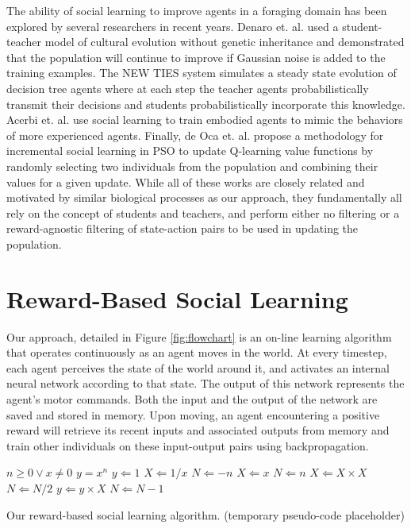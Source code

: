 \documentclass{acm_proc_article-sp}
\begin{document}
The ability of social learning to improve agents in a foraging domain has been explored by several researchers in recent years. Denaro et. al. \cite{denaro1996cultural} used a student-teacher model of cultural evolution without genetic inheritance and demonstrated that the population will continue to improve if Gaussian noise is added to the training examples. The NEW TIES system \cite{haasdijk2008social, vogt2010modeling} simulates a steady state evolution of decision tree agents where at each step the teacher agents probabilistically transmit their decisions and students probabilistically incorporate this knowledge. Acerbi et. al. \cite{acerbi2007social} use social learning to train embodied agents to mimic the behaviors of more experienced agents. Finally, de Oca et. al. \cite{de2011incremental} propose a methodology for incremental social learning in PSO to update Q-learning \cite{watkins1992q} value functions by randomly selecting two individuals from the population and combining their values for a given update. While all of these works are closely related and motivated by similar biological processes as our approach, they fundamentally all rely on the concept of students and teachers, and perform either no filtering or a reward-agnostic filtering of state-action pairs to be used in updating the population.


\section{Reward-Based Social Learning}
\label{sec:rbsl}

Our approach, detailed in Figure \ref{fig:flowchart} is an on-line learning algorithm that operates continuously as an agent moves in the world. At every timestep, each agent perceives the state of the world around it, and activates an internal neural network according to that state. The output of this network represents the agent's motor commands. Both the input and the output of the network are saved and stored in memory. Upon moving, an agent encountering a positive reward will retrieve its recent inputs and associated outputs from memory and train other individuals on these input-output pairs using backpropagation.

\begin{algorithm}
\begin{algorithmic}
\REQUIRE $n \geq 0 \vee x \neq 0$
\ENSURE $y = x^n$
\STATE $y \Leftarrow 1$
\STATE $X \Leftarrow 1 / x$
\STATE $N \Leftarrow -n$
\ELSE
\STATE $X \Leftarrow x$
\STATE $N \Leftarrow n$
\ENDIF
{}
\STATE $X \Leftarrow X \times X$
\STATE $N \Leftarrow N / 2$
\ELSE[$N$ is odd]
\STATE $y \Leftarrow y \times X$
\STATE $N \Leftarrow N - 1$
\ENDIF
\ENDWHILE
\end{algorithmic}
\caption{Our reward-based social learning algorithm. (temporary pseudo-code placeholder)}
\label{alg:rewardsbased}
\end{algorithm}
\end{document}
